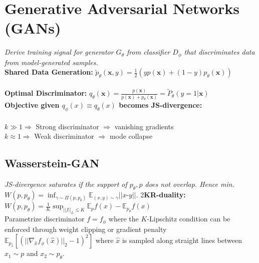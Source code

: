 \color{black}
\columnbreak

\section*{Generative Adversarial Networks (GANs)}
\textit{Derive training signal for generator $G_\theta$ from classifier $D_\phi$ that discriminates data from model-generated samples.}\\
\textbf{Shared Data Generation:} $\tilde p_\theta(\mathbf x, y)=\frac{1}{2}(yp(\mathbf x)+(1-y)p_\theta(\mathbf x))$\\
\\
\textbf{Optimal Discriminator:} $q_\theta(\mathbf x)=\frac{p(\mathbf x)}{p(\mathbf x)+p_\theta(\mathbf x)}=\tilde P_\theta(y=1|\mathbf x)$\\
\textbf{Objective given $q_\phi(x) \equiv q_\theta(x)$ becomes JS-divergence:}\\
\\
$k \gg 1 \Rightarrow$ Strong discriminator $\Rightarrow$ vanishing gradients\\
$k \approx 1 \Rightarrow$ Weak discriminator $\Rightarrow$ mode collapse
\subsection*{Wasserstein-GAN}
\textit{JS-divergence saturates if the support of $p_\theta, p$ does not overlap. Hence min. $W(p, p_\theta) \!=\! \inf_{\gamma \sim \Pi(p, p_\theta)} \!\mathbb{E}_{(x,y) \sim \gamma} ||x\text{-}y||.$}
2\textbf{KR-duality:} %
$W(p, p_\theta) \!=\! \frac{1}{K} \sup_{||f||_L \leq K} \mathbb{E}_{p} f(x) - \mathbb{E}_{p_\theta} f(x)$\\
Parametrize discriminator $f = f_\phi$ where the $K$-Lipschitz condition can be enforced through weight clipping or gradient penalty $\mathbb E_{p_{\hat{x}}}[(||\nabla_{\hat{x}} f_\phi(\hat{x})||_2 - 1)^2]$ where $\hat{x}$ is sampled along straight lines between $x_1 \sim p$ and $x_2 \sim p_\theta$.